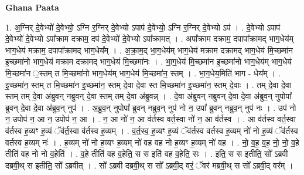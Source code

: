\documentclass[17pt]{extarticle}
\begin{document}
\textbf{Ghana Paata } \newline

1. अ॒ग्निर् दे॒वेभ्यो॑ दे॒वेभ्यो॒ ऽग्नि र॒ग्निर् दे॒वेभ्यो ऽपाप॑ दे॒वेभ्यो॒ ऽग्नि र॒ग्निर् दे॒वेभ्यो ऽप॑ । . दे॒वेभ्यो ऽपाप॑ दे॒वेभ्यो॑ दे॒वेभ्यो ऽपा᳚क्राम दक्राम॒ दप॑ दे॒वेभ्यो॑ दे॒वेभ्यो ऽपा᳚क्रामत् । . अपा᳚क्राम दक्राम॒ दपापा᳚क्रामद् भाग॒धेय॑म् भाग॒धेय॑ मक्राम॒ दपापा᳚क्रामद् भाग॒धेय᳚म् । . अ॒क्रा॒म॒द् भा॒ग॒धेय॑म् भाग॒धेय॑ मक्राम दक्रामद् भाग॒धेय॑ मि॒च्छमा॑न इ॒च्छमा॑नो भाग॒धेय॑ मक्राम दक्रामद् भाग॒धेय॑ मि॒च्छमा॑नः । . भा॒ग॒धेय॑ मि॒च्छमा॑न इ॒च्छमा॑नो भाग॒धेय॑म् भाग॒धेय॑ मि॒च्छमा॑न ॒स्तम् त मि॒च्छमा॑नो भाग॒धेय॑म् भाग॒धेय॑ मि॒च्छमा॑न॒ स्तम् । . भा॒ग॒धेय॒मिति॑ भाग - धेय᳚म् । . इ॒च्छमा॑न॒ स्तम् त मि॒च्छमा॑न इ॒च्छमा॑न॒ स्तम् दे॒वा दे॒वा स्त मि॒च्छमा॑न इ॒च्छमा॑न॒ स्तम् दे॒वाः । . तम् दे॒वा दे॒वा स्तम् तम् दे॒वा अ॑ब्रुवन् नब्रुवन् दे॒वा स्तम् तम् दे॒वा अ॑ब्रुवन्न् । . दे॒वा अ॑ब्रुवन् नब्रुवन् दे॒वा दे॒वा अ॑ब्रुव॒न् नुपोपा᳚ ब्रुवन् दे॒वा दे॒वा अ॑ब्रुव॒न् नुप॑ । . अ॒ब्रु॒व॒न् नुपोपा᳚ ब्रुवन् नब्रुव॒न् नुप॑ नो न॒ उपा᳚ ब्रुवन् नब्रुव॒न् नुप॑ नः । . उप॑ नो न॒ उपोप॑ न॒ आ न॒ उपोप॑ न॒ आ । . न॒ आ नो॑ न॒ आ व॑र्तस्व वर्त॒स्वा नो॑ न॒ आ व॑र्तस्व । . आ व॑र्तस्व वर्त॒स्वा व॑र्तस्व ह॒व्यꣳ ह॒व्यं ॅव॑र्त॒स्वा व॑र्तस्व ह॒व्यम् । . व॒र्त॒स्व॒ ह॒व्यꣳ ह॒व्यं ॅव॑र्तस्व वर्तस्व ह॒व्यम् नो॑ नो ह॒व्यं ॅव॑र्तस्व वर्तस्व ह॒व्यम् नः॑ । . ह॒व्यम् नो॑ नो ह॒व्यꣳ ह॒व्यम् नो॑ वह वह नो ह॒व्यꣳ ह॒व्यम् नो॑ वह । . नो॒ व॒ह॒ व॒ह॒ नो॒ नो॒ व॒हे तीति॑ वह नो नो व॒हेति॑ । . व॒हे तीति॑ वह व॒हेति॒ स स इति॑ वह व॒हेति॒ सः । . इति॒ स स इतीति॒ सो᳚ ऽब्रवी दब्रवी॒थ् स इतीति॒ सो᳚ ऽब्रवीत् । . सो᳚ ऽब्रवी दब्रवी॒थ् स सो᳚ ऽब्रवी॒द् वरं॒ ॅवर॑ मब्रवी॒थ् स सो᳚ ऽब्रवी॒द् वर᳚म् । \newline
\end{document}
